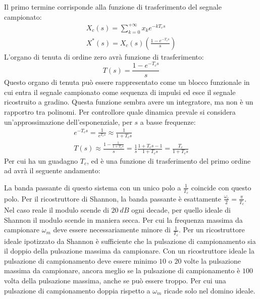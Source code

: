 \documentclass{article}
\numberwithin{equation}{subsection}
\begin{document}
Il primo termine corrisponde alla funzione di trasferimento del segnale campionato:
\begin{gather}
    X_c(s)=\sum_{k=0}^{+\infty}x_ke^{-kT_cs}\\
    X^*(s)=X_c(s)\left(\displaystyle\frac{1-e^{-T_cs}}{s}\right)
\end{gather}
L'organo di tenuta di ordine zero avrà funzione di trasferimento: 
\begin{equation}
    T(s)=\displaystyle\frac{1-e^{-T_cs}}{s}
\end{equation}
Questo organo di tenuta può essere rappresentato come un blocco funzionale in cui entra il segnale campionato come sequenza di impulsi ed esce il segnale ricostruito a gradino. 
Questa funzione sembra avere un integratore, ma non è un rapportro tra polinomi. Per controllore quale dinamica prevale si considera un'approssimazione dell'esponenziale, per 
$s$ a basse frequenze: 
\begin{gather}
    e^{-T_cs}=\displaystyle\frac{1}{e^{T_cs}}\approx\frac{1}{1+T_cs}\\
    T(s)\approx\displaystyle\frac{1-\displaystyle\frac{1}{1+T_cs}}{s}=\frac{1}{s}\frac{1+T_cs-1}{1+T_cs}=\frac{T_c}{1+T_cs}
\end{gather}
Per cui ha un guadagno $T_c$, ed è una funzione di trasferimento del primo ordine ad avrà il seguente andamento:
\begin{center}
\end{center}
La banda passante di questo sistema con un unico polo a $\displaystyle\frac{1}{T_c}$ coincide con questo polo. Per il ricostruttore di Shannon, la banda passante è esattamente 
$\displaystyle\frac{\omega_c}{2}=\frac{\pi}{T_c}$. Nel caso reale il modulo scende di $20\:dB$ ogni decade, per quello ideale di Shannon il modulo scende in maniera secca. 
Per cui la frequenza massima da campionare $\omega_m$ deve essere necessariamente minore di $\displaystyle\frac{1}{T_c}$. Per un ricostruttore ideale ipotizzato da Shannon 
è sufficiente che la pulsazione di campionamento sia il doppio della pulsazione massima da campionare. Con un ricostruttore ideale la pulsazione di campionamento deve essere 
minimo $10$ o $20$ volte la pulsazione massima da campionare, ancora meglio se la pulsazione di campionamento è $100$ volta della pulsazione massima, anche se può essere 
troppo. Per cui una pulsazione di campionamento doppia rispetto a $\omega_m$ ricade solo nel domino ideale. 
\end{document}

